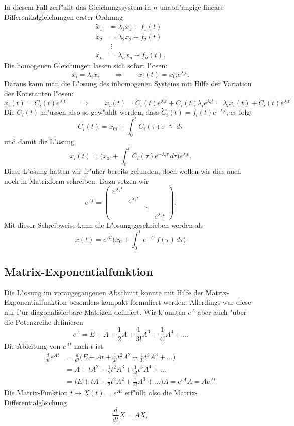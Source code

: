 In diesem Fall zerf"allt das Gleichungssystem in $n$ unabh"angige
lineare Differentialgleichungen erster Ordnung
\begin{align*}
\dot{x}_1&=\lambda_1x_1 + f_1(t)\\
\dot{x}_2&=\lambda_2x_2 + f_2(t)\\
&\;\vdots\\
\dot{x}_n&=\lambda_nx_n + f_n(t).
\end{align*}
Die homogenen Gleichungen lassen sich sofort l"osen:
\[
\dot{x}_i=\lambda_ix_i
\qquad
\Rightarrow
\qquad
x_i(t)=x_{0i}e^{\lambda_it}.
\]
Daraus kann man die L"osung des inhomogenen Systems mit Hilfe der
Variation der Konstanten l"osen:
\[
x_i(t)=C_i(t)e^{\lambda_i t}
\qquad
\Rightarrow
\qquad
\dot{x}_i(t)
=
\dot{C}_i(t)e^{\lambda_i t}+C_i(t)\lambda_ie^{\lambda_i t}
=
\lambda_i x_i(t) + \dot{C}_i(t)e^{\lambda_i t}
\]
Die $C_i(t)$ m"ussen also so gew"ahlt werden, dass
$\dot{C}_i(t)=f_i(t)e^{-\lambda_i t}$, es folgt
\[
C_i(t)=x_{0i}+\int_0^t C_i(\tau)e^{-\lambda_i \tau}\,d\tau
\]
und damit die L"osung
\[
x_i(t)
=
\biggl(x_{0i}+\int_0^t C_i(\tau)e^{-\lambda_i \tau}\,d\tau\biggr)
e^{\lambda_i t}.
\]
Diese L"osung hatten wir fr"uher bereits gefunden, doch wollen wir
dies auch noch in Matrixform schreiben.
Dazu setzen wir
\[
e^{At}=\begin{pmatrix}
e^{\lambda_1 t}&               &      &               \\
               &e^{\lambda_1 t}&      &               \\
               &               &\ddots&               \\
               &               &      &e^{\lambda_n t}
\end{pmatrix}.
\]
Mit dieser Schreibweise kann die L"osung geschrieben werden als
\[
x(t)
=
e^{At}
\biggl(x_0 + \int_0^t e^{-A\tau}f(\tau)\,d\tau\biggr)
\]

\subsection{Matrix-Exponentialfunktion}
Die L"osung im vorangegangenen Abschnitt konnte mit Hilfe der
Matrix-Exponentialfunktion besonders kompakt formuliert werden.
Allerdings war diese nur f"ur diagonalisierbare Matrizen definiert.
Wir k"onnten $e^A$ aber auch "uber die Potenzreihe definieren
\[
e^A=E+A+\frac12A+\frac1{3!}A^3+\frac1{4!} A^4+\dots
\]
Die Ableitung von $e^{At}$ nach $t$ ist
\begin{align*}
\frac{d}{dt}e^{At}
&=
\frac{d}{dt}\biggl(E+At+\frac1{2!}t^2A^2+\frac1{3!}t^3A^3+\dots\Biggr)
\\
&=
A+tA^2+\frac12t^2A^3+\frac1{3!}t^3A^4+\dots
\\
&=
\biggl(E+tA+\frac12t^2A^2+\frac1{3!}A^3+\dots\biggr)A
=e^{tA}A=Ae^{At}
\end{align*}
Die Matrix-Funktion $t\mapsto X(t)=e^{At}$ erf"ullt also die
Matrix-Differentialgleichung
\begin{equation}
\frac{d}{dt} X = AX,
\label{linear:matrix-dgl}
\end{equation}

